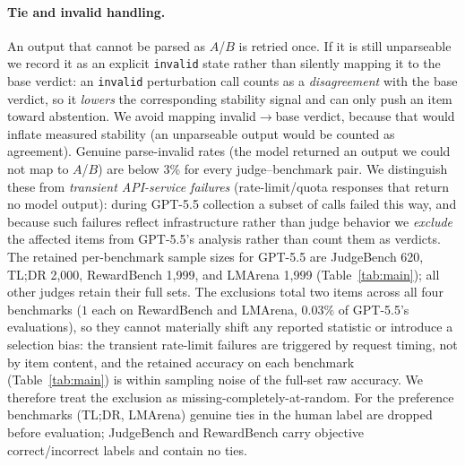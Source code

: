\paragraph{Tie and invalid handling.}
An output that cannot be parsed as $A$/$B$ is retried once. If it is still unparseable we record it as an explicit \texttt{invalid} state rather than silently mapping it to the base verdict: an \texttt{invalid} perturbation call counts as a \emph{disagreement} with the base verdict, so it \emph{lowers} the corresponding stability signal and can only push an item toward abstention. We avoid mapping invalid$\to$base verdict, because that would inflate measured stability (an unparseable output would be counted as agreement). Genuine parse-invalid rates (the model returned an output we could not map to $A$/$B$) are below 3\% for every judge--benchmark pair. We distinguish these from \emph{transient API-service failures} (rate-limit/quota responses that return no model output): during GPT-5.5 collection a subset of calls failed this way, and because such failures reflect infrastructure rather than judge behavior we \emph{exclude} the affected items from GPT-5.5's analysis rather than count them as verdicts. The retained per-benchmark sample sizes for GPT-5.5 are JudgeBench 620, TL;DR 2{,}000, RewardBench 1{,}999, and LMArena 1{,}999 (Table~\ref{tab:main}); all other judges retain their full sets. The exclusions total two items across all four benchmarks ($1$ each on RewardBench and LMArena, $0.03\%$ of GPT-5.5's evaluations), so they cannot materially shift any reported statistic or introduce a selection bias: the transient rate-limit failures are triggered by request timing, not by item content, and the retained accuracy on each benchmark (Table~\ref{tab:main}) is within sampling noise of the full-set raw accuracy. We therefore treat the exclusion as missing-completely-at-random. For the preference benchmarks (TL;DR, LMArena) genuine ties in the human label are dropped before evaluation; JudgeBench and RewardBench carry objective correct/incorrect labels and contain no ties.

